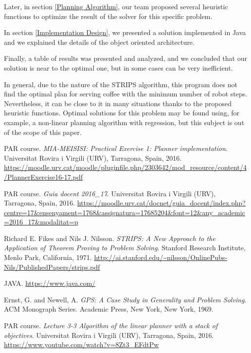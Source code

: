 \documentclass[12pt,a4paper,oneside]{article}
\numberwithin{equation}{section}
\numberwithin{equation}{section}
\theoremstyle{definition}
\begin{document}
Later, in section \ref{Planning Algorithm}, our team proposed several heuristic functions to optimize the result of the solver for this specific problem.


In section \ref{Implementation Design},  we presented a solution implemented in Java and we explained the details of the object oriented architecture.

Finally, a table of results was presented and analyzed, and we concluded that our solution is near to the optimal one, but in some cases can be very inefficient.


In general, due to the nature of the STRIPS algorithm, this program does not find the optimal plan for serving coffee with the minimum number of robot steps. Nevertheless, it can be close to it in many situations thanks to the proposed heuristic functions. Optimal solutions for this problem may be found using, for example, a non-linear planning algorithm with regression, but this subject is out of the scope of this paper.



\newpage

\begin{thebibliography}{25}
	
	
	 PAR course. \textsl{MIA-MEISISI: Practical Exercise 1: Planner implementation}. Universitat Rovira i Virgili (URV), Tarragona, Spain, 2016. \url{https://moodle.urv.cat/moodle/pluginfile.php/2303642/mod_resource/content/4/PlannerExercise16-17.pdf}
	
	
	 PAR course. \textsl{Guia docent 2016\_17}. Universitat Rovira i Virgili (URV), Tarragona, Spain, 2016. \url{https://moodle.urv.cat/docnet/guia_docent/index.php?centre=17&ensenyament=1768&assignatura=17685204&font=12&any_academic=2016_17&modalitat=p}
	
	
	 Richard E. Fikes and Nils J. Nilsson. \textsl{STRIPS: A New Approach to the
		Application of Theorem Proving to Problem Solving}. Stanford Research Institute, Menlo Park, California, 1971. \url{http://ai.stanford.edu/~nilsson/OnlinePubs-Nils/PublishedPapers/strips.pdf}
	
	
	 JAVA. \url{https://www.java.com/}
	
	
	 Ernst, G. and Newell, A. \textsl{GPS: A Case Study in Generality and Problem Solving}. ACM Monograph Series. Academic Press, New York, New York, 1969.
	
	
	 PAR course. \textsl{Lecture 3-3 Algorithm of the linear planner with a stack of objectives}. Universitat Rovira i Virgili (URV), Tarragona, Spain, 2016. \url{https://www.youtube.com/watch?v=8Zt3_EFdtPw}
	
\end{thebibliography}
\end{document}
